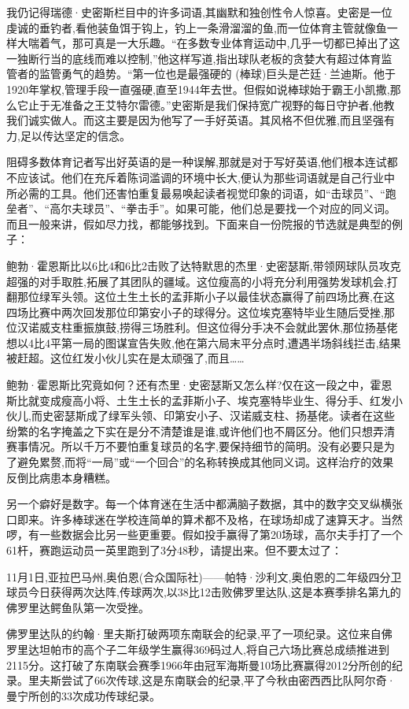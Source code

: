 我仍记得瑞德·史密斯栏目中的许多词语,其幽默和独创性令人惊喜。史密是一位虔诚的垂钓者,看他装鱼饵于钩上，钓上一条滑溜溜的鱼,而一位体育主管就像鱼一样大喘着气，那可真是一大乐趣。“在多数专业体育运动中,几乎一切都已掉出了这一独断行当的底线而难以控制,”他这样写道,指出球队老板的贪婪大有超过体育监管者的监管勇气的趋势。“第一位也是最强硬的 (棒球)巨头是芒廷·兰迪斯。他于1920年掌权,管理手段一直强硬,直至1944年去世。但假如说棒球始于霸王小凯撒,那么它止于无准备之王艾特尔雷德。”史密斯是我们保持宽广视野的每日守护者,他教我们诚实做人。而这主要是因为他写了一手好英语。其风格不但优雅,而且坚强有力,足以传达坚定的信念。

阻碍多数体育记者写出好英语的是一种误解,那就是对于写好英语,他们根本连试都不应该试。他们在充斥着陈词滥调的环境中长大,便认为那些词语就是自己行业中所必需的工具。他们还害怕重复最易唤起读者视觉印象的词语，如“击球员”、“跑垒者”、“高尔夫球员”、“拳击手”。如果可能，他们总是要找一个对应的同义词。而且一般来讲，假如尽力找，都能够找到。下面来自一份院报的节选就是典型的例子：

鲍勃·霍恩斯比以6比4和6比2击败了达特默思的杰里·史密瑟斯,带领网球队员攻克超强的对手取胜,拓展了其团队的疆域。这位瘦高的小将充分利用强势发球机会,打翻那位绿军头领。这位土生土长的孟菲斯小子以最佳状态赢得了前四场比赛,在这四场比赛中两次回发那位印第安小子的球得分。这位埃克塞特毕业生随后受挫,那位汉诺威支柱重振旗鼓,捞得三场胜利。但这位得分手决不会就此罢休,那位扬基佬想以4比4平第一局的图谋宣告失败,他在第六局末平分点时,遭遇半场斜线拦击,结果被赶超。这位红发小伙儿实在是太顽强了,而且……

鲍勃·霍恩斯比究竟如何？还有杰里·史密瑟斯又怎么样?仅在这一段之中，霍恩斯比就变成瘦高小将、土生土长的孟菲斯小子、埃克塞特毕业生、得分手、红发小伙儿,而史密瑟斯成了绿军头领、印第安小子、汉诺威支柱、扬基佬。读者在这些纷繁的名字掩盖之下实在是分不清楚谁是谁,或许他们也不屑区分。他们只想弄清赛事情况。所以千万不要怕重复球员的名字,要保持细节的简明。没有必要只是为了避免累赘,而将“一局”或“一个回合”的名称转换成其他同义词。这样治疗的效果反倒比病患本身糟糕。

另一个癖好是数字。每一个体育迷在生活中都满脑子数据，其中的数字交叉纵横张口即来。许多棒球迷在学校连简单的算术都不及格，在球场却成了速算天才。当然啰，有一些数据会比另一些更重要。假如投手赢得了第20场球，高尔夫手打了一个61杆，赛跑运动员一英里跑到了3分48秒，请提出来。但不要太过了：

11月1日,亚拉巴马州,奥伯恩(合众国际社)——帕特·沙利文,奥伯恩的二年级四分卫球员今日获得两次达阵,传球两次,以38比12击败佛罗里达队,这是本赛季排名第九的佛罗里达鳄鱼队第一次受挫。

佛罗里达队的约翰·里夫斯打破两项东南联会的纪录,平了一项纪录。这位来自佛罗里达坦帕市的高个子二年级学生赢得369码过人,将自己六场比赛总成绩推进到2115分。这打破了东南联会赛季1966年由冠军海斯曼10场比赛赢得2012分所创的纪录。里夫斯尝试了66次传球,这是东南联会的纪录,平了今秋由密西西比队阿尔奇·曼宁所创的33次成功传球纪录。

